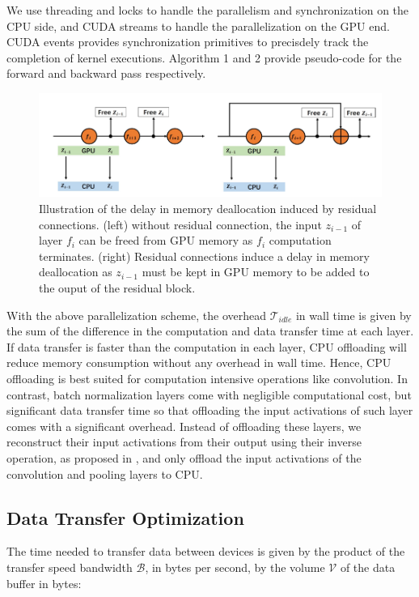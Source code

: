 \documentclass[11pt,onecolumn]{article}
\begin{document}
We use threading and locks to handle the parallelism and synchronization on the CPU side,
and CUDA streams to handle the parallelization on the GPU end. 
CUDA events provides synchronization primitives to precisdely track 
the completion of kernel executions.
Algorithm 1 and 2 provide pseudo-code for the forward and backward pass respectively.

\begin{figure}[h]
\includegraphics[width=\textwidth]{Figure3.png}
\caption{Illustration of the delay in memory deallocation induced by residual connections.
(left) without residual connection, the input $z_{i-1}$ of layer $f_i$ can be freed from GPU memory 
as $f_i$ computation terminates. 
(right) Residual connections induce a delay in memory deallocation
as $z_{i-1}$ must be kept in GPU memory to be added to the ouput of the residual block. 
}
\end{figure}

With the above parallelization scheme, the overhead $\mathcal{T}_{idle}$ in wall time 
is given by the sum of the difference in the computation and data transfer time at each layer.
If data transfer is faster than the computation in each layer, 
CPU offloading will reduce memory consumption without any overhead in wall time.
Hence, CPU offloading is best suited for computation intensive operations like convolution.
In contrast, batch normalization layers come with negligible computational cost,
but significant data transfer time so that offloading the input activations of 
such layer comes with a significant overhead.
Instead of offloading these layers, we reconstruct their input activations 
from their output using their inverse operation, as proposed in \cite{rota2018place},
and only offload the input activations of the convolution and pooling layers to CPU. 

 \subsection{Data Transfer Optimization}
The time needed to transfer data between devices is given by the product of the
transfer speed bandwidth $\mathcal{B}$, in bytes per second, by the volume 
$\mathcal{V}$ of the data buffer in bytes:
\end{document}
